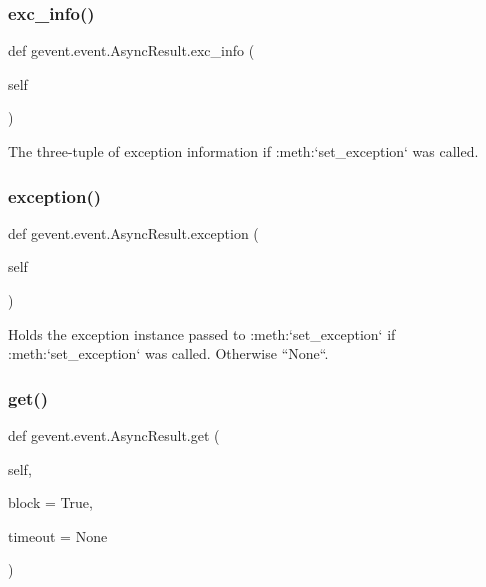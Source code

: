 \subsubsection{\texorpdfstring{exc\+\_\+info()}{exc\_info()}}
{\footnotesize\ttfamily def gevent.\+event.\+Async\+Result.\+exc\+\_\+info (\begin{DoxyParamCaption}\item[{}]{self }\end{DoxyParamCaption})}

\begin{DoxyVerb}The three-tuple of exception information if :meth:`set_exception` was called.
\end{DoxyVerb}
 \mbox{\label{classgevent_1_1event_1_1_async_result_a4eaed73fc940b8d8becc7536aa157ec1}} 
\subsubsection{\texorpdfstring{exception()}{exception()}}
{\footnotesize\ttfamily def gevent.\+event.\+Async\+Result.\+exception (\begin{DoxyParamCaption}\item[{}]{self }\end{DoxyParamCaption})}

\begin{DoxyVerb}Holds the exception instance passed to :meth:`set_exception` if :meth:`set_exception` was called.
Otherwise ``None``.\end{DoxyVerb}
 \mbox{\label{classgevent_1_1event_1_1_async_result_a0bce88da8039374f01304f65b7a43a34}} 
\subsubsection{\texorpdfstring{get()}{get()}}
{\footnotesize\ttfamily def gevent.\+event.\+Async\+Result.\+get (\begin{DoxyParamCaption}\item[{}]{self,  }\item[{}]{block = {\ttfamily True},  }\item[{}]{timeout = {\ttfamily None} }\end{DoxyParamCaption})}

